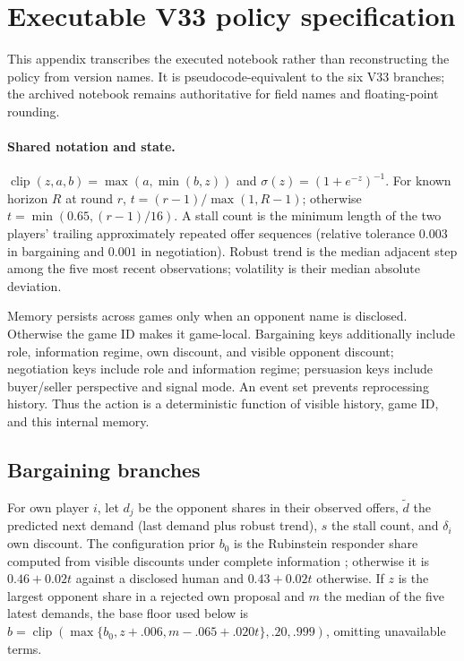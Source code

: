 \section{Executable V33 policy specification}
\label{app:policy}

This appendix transcribes the executed notebook rather than reconstructing the
policy from version names. It is pseudocode-equivalent to the six V33 branches;
the archived notebook remains authoritative for field names and floating-point
rounding.

\paragraph{Shared notation and state.}
$\operatorname{clip}(z,a,b)=\max(a,\min(b,z))$ and
$\sigma(z)=(1+e^{-z})^{-1}$. For known horizon $R$ at round $r$,
$t=(r-1)/\max(1,R-1)$; otherwise $t=\min(0.65,(r-1)/16)$. A stall count is the
minimum length of the two players' trailing approximately repeated offer
sequences (relative tolerance $0.003$ in bargaining and $0.001$ in
negotiation). Robust trend is the median adjacent step among the five most
recent observations; volatility is their median absolute deviation.

Memory persists across games only when an opponent name is disclosed. Otherwise
the game ID makes it game-local. Bargaining keys additionally include role,
information regime, own discount, and visible opponent discount; negotiation
keys include role and information regime; persuasion keys include buyer/seller
perspective and signal mode. An event set prevents reprocessing history. Thus
the action is a deterministic function of visible history, game ID, and this
internal memory.

\subsection{Bargaining branches}

For own player $i$, let $d_j$ be the opponent shares in their observed offers,
$\tilde d$ the predicted next demand (last demand plus robust trend), $s$ the
stall count, and $\delta_i$ own discount. The configuration prior $b_0$ is the
Rubinstein responder share computed from visible discounts under complete
information \citep{rubinstein1982perfect};
otherwise it is $0.46+0.02t$ against a disclosed human and
$0.43+0.02t$ otherwise. If $z$ is the largest opponent share in a rejected own
proposal and $m$ the median of the five latest demands, the base floor used
below is $b=\operatorname{clip}(\max\{b_0,z+.006,m-.065+.020t\},.20,.999)$,
omitting unavailable terms.

